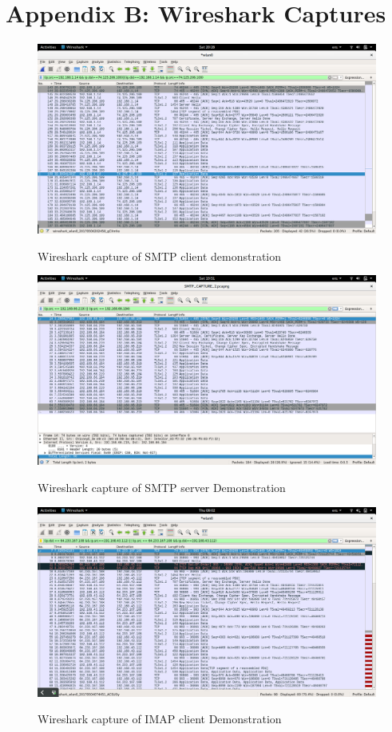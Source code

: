\documentclass[11pt]{article}
\begin{document}
\section{Appendix B: Wireshark Captures}
\begin{figure}[!htb]
\centering
\caption{Wireshark capture of SMTP client demonstration}
\includegraphics[width=17cm]{images/SMTP_CLIENT.png}
\label{SMTP_CLIENT}
\end{figure}

\begin{figure}[!htb]
\centering
\caption{Wireshark capture of SMTP server Demonstration}
\includegraphics[width=17cm]{images/SMTP_SERVER.png}
\label{SMTP_SERVER}
\end{figure}

\begin{figure}[!htb]
\centering
\caption{Wireshark capture of IMAP client Demonstration}
\includegraphics[width=17cm]{images/IMAP_CLIENT.png}
\label{IMAP_CLIENT}
\end{figure}
\end{document}
